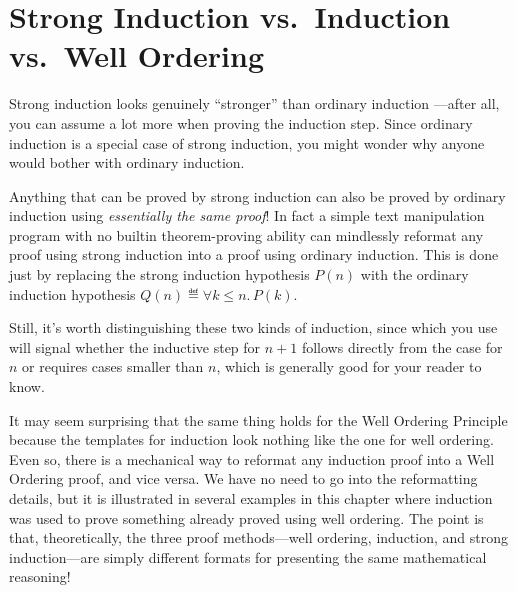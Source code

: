 \begin{problems}
\practiceproblems
{}

\classproblems
{}

\homeworkproblems
{}

\examproblems
{}

\end{problems}

\section{Strong Induction vs.\ Induction vs.\ Well Ordering}
\label{versusWO}
Strong induction looks genuinely ``stronger'' than ordinary induction
---after all, you can assume a lot more when proving the induction
step.  Since ordinary induction is a special case of strong induction,
you might wonder why anyone would bother with ordinary induction.

Anything that can be proved by strong induction can also be proved by
ordinary induction using \emph{essentially the same proof}!  In fact a
simple text manipulation program with no builtin theorem-proving
ability can mindlessly reformat any proof using strong induction into
a proof using ordinary induction.  This is done just by replacing the
strong induction hypothesis $P(n)$ with the ordinary induction
hypothesis $Q(n) \eqdef \forall k \leq n.\, P(k)$.

Still, it's worth distinguishing these two kinds of induction, since
which you use will signal whether the inductive step for $n+1$ follows
directly from the case for $n$ or requires cases smaller than $n$,
which is generally good for your reader to know.

It may seem surprising that the same thing holds for the Well Ordering
Principle because the templates for induction look nothing like the
one for well ordering.  Even so, there is a mechanical way to reformat
any induction proof into a Well Ordering proof, and vice versa.  We
have no need to go into the reformatting details, but it is
illustrated in several examples in this chapter where induction was
used to prove something already proved using well ordering.  The point
is that, theoretically, the three proof methods---well ordering,
induction, and strong induction---are simply different formats for
presenting the same mathematical reasoning!

